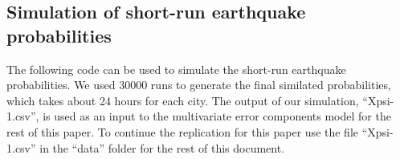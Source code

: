 \documentclass[
]{article}
\begin{document}
\hypertarget{simulation-of-short-run-earthquake-probabilities}{%
\subsection{Simulation of short-run earthquake
probabilities}\label{simulation-of-short-run-earthquake-probabilities}}

The following code can be used to simulate the short-run earthquake
probabilities. We used 30000 runs to generate the final similated
probabilities, which takes about 24 hours for each city. The output of
our simulation, ``Xpsi-1.csv'', is used as an input to the multivariate
error components model for the rest of this paper. To continue the
replication for this paper use the file ``Xpsi-1.csv'' in the ``data''
folder for the rest of this document.
\end{document}
